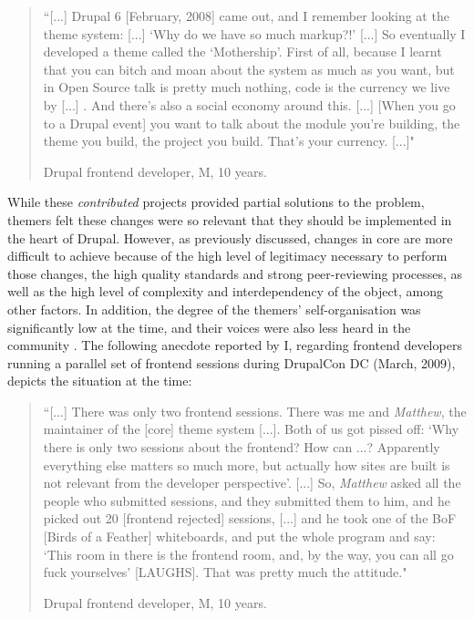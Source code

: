 \begin{quotation}
``[...] Drupal 6 [February, 2008] came out, and I remember looking at the theme system: [...] `Why do we have so much markup?!' [...] So eventually I developed a theme called the `Mothership'. First of all, because I learnt that you can bitch and moan about the system as much as you want, but in Open Source talk is pretty much nothing, code is the currency we live by [...] . And there's also a social economy around this. [...] [When you go to a Drupal event] you want to talk about the module you're building, the theme you build, the project you build. That's your currency. [...]"
\begin{flushright}\footnotesize{Drupal frontend developer, M, 10 years.}\end{flushright}
\end{quotation}

While these \textit{contributed} projects provided partial solutions to the problem, themers felt these changes were so relevant that they should be implemented in the heart of Drupal. However, as previously discussed, changes in core are more difficult to achieve because of the high level of legitimacy necessary to perform those changes, the high quality standards and strong peer-reviewing processes, as well as the high level of complexity and interdependency of the object, among other factors. In addition, the degree of the themers' self-organisation was significantly low at the time, and their voices were also less heard in the community \parencite{Zilouchian2011}. The following anecdote reported by I, regarding frontend developers running a parallel set of frontend sessions during DrupalCon DC (March, 2009), depicts the situation at the time:

\begin{quotation}
``[...] There was only two frontend sessions. There was me and \textit{Matthew}, the maintainer of the [core] theme system [...]. Both of us got pissed off: `Why there is only two sessions about the frontend? How can ...? Apparently everything else matters so much more, but actually how sites are built is not relevant from the developer perspective'. [...] So, \textit{Matthew} asked all the people who submitted sessions, and they submitted them to him, and he picked out 20 [frontend rejected] sessions, [...] and he took one of the BoF [Birds of a Feather] whiteboards, and put the whole program and say: `This room in there is the frontend room, and, by the way, you can all go fuck yourselves' [LAUGHS]. That was pretty much the attitude."
\begin{flushright}\footnotesize{Drupal frontend developer, M, 10 years.}\end{flushright}
\end{quotation}

